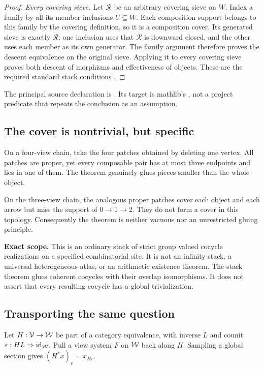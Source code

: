 \begin{proof}
\emph{Every covering sieve.} Let $\mathcal R$ be an arbitrary covering sieve on $W$. Index a family by all its member inclusions $U\subseteq W$. Each composition support belongs to this family by the covering definition, so it is a composition cover. Its generated sieve is exactly $\mathcal R$: one inclusion uses that $\mathcal R$ is downward closed, and the other uses each member as its own generator. The family argument therefore proves the descent equivalence on the original sieve. Applying it to every covering sieve proves both descent of morphisms and effectiveness of objects. These are the required standard stack conditions \cite{KS:stacks-stack,KS:mathlib-stack}.
\end{proof}
The principal source declaration is . Its target is mathlib's , not a project predicate that repeats the conclusion as an assumption.

\subsection{The cover is nontrivial, but specific}
On a four-view chain, take the four patches obtained by deleting one vertex. All patches are proper, yet every composable pair has at most three endpoints and lies in one of them. The theorem genuinely glues pieces smaller than the whole object.

On the three-view chain, the analogous proper patches cover each object and each arrow but miss the support of \(0\to1\to2\). They do not form a cover in this topology. Consequently the theorem is neither vacuous nor an unrestricted gluing principle.

\begin{scopebox}
\textbf{Exact scope.} This is an ordinary stack of strict group valued cocycle realizations on a specified combinatorial site. It is not an infinity-stack, a universal heterogeneous atlas, or an arithmetic existence theorem. The stack theorem glues coherent cocycles with their overlap isomorphisms. It does not assert that every resulting cocycle has a global trivialization.
\end{scopebox}

\label{KS:sec:relative}
\subsection{Transporting the same question}
Let \(H:\mathcal V\to\mathcal W\) be part of a category equivalence, with inverse \(L\) and counit \(\varepsilon:HL\Rightarrow\operatorname{id}_\mathcal W\). Pull a view system \(F\) on \(\mathcal W\) back along \(H\). Sampling a global section gives \((H^*x)_v=x_{Hv}\).

